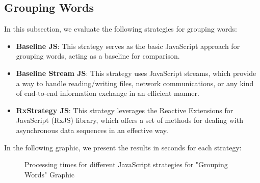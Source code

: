 \clearpage


\subsection{Grouping Words}
\label{subsec:grouping_words_js}

In this subsection, we evaluate the following strategies for grouping words:

\begin{itemize}
    \item \textbf{Baseline JS}: This strategy serves as the basic JavaScript approach for grouping words, acting as a baseline for comparison.
    \item \textbf{Baseline Stream JS}: This strategy uses JavaScript streams, which provide a way to handle reading/writing files, network communications, or any kind of end-to-end information exchange in an efficient manner.
    \item \textbf{RxStrategy JS}: This strategy leverages the Reactive Extensions for JavaScript (RxJS) library, which offers a set of methods for dealing with asynchronous data sequences in an effective way.
\end{itemize}

In the following graphic, we present the results in seconds for each strategy:


\begin{figure}[H]
    \raggedright
    \caption{Processing times for different JavaScript strategies for "Grouping Words" Graphic}
    \label{fig:grouping_words_processing_times_js}
\end{figure}



\clearpage


